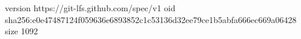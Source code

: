 version https://git-lfs.github.com/spec/v1
oid sha256:e0e47487124f059636e6893852c1c53136d32ee79ce1b5abfa666ec669a06428
size 1092
